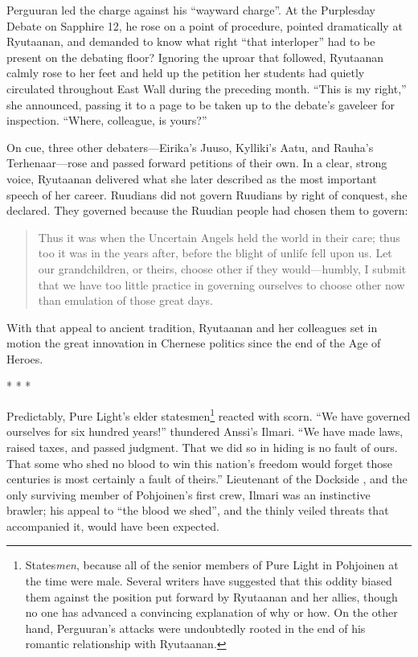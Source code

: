 \documentclass[12pt]{report}
\begin{document}
Perguuran led the charge against his ``wayward charge''.  At the
Purplesday Debate on Sapphire 12, he rose on a point of procedure,
pointed dramatically at Ryutaanan, and demanded to know what right
``that interloper'' had to be present on the debating floor?  Ignoring
the uproar that followed, Ryutaanan calmly rose to her feet and held
up the petition her students had quietly circulated throughout East
Wall during the preceding month.  ``This is my right,'' she announced,
passing it to a page to be taken up to the debate's gaveleer for
inspection.  ``Where, colleague, is yours?''

On cue, three other debaters---Eirika's Juuso, Kylliki's Aatu, and
Rauha's Terhenaar---rose and passed forward petitions of their own.
In a clear, strong voice, Ryutaanan delivered what she later described
as the most important speech of her career.  Ruudians did not govern
Ruudians by right of conquest, she declared.  They governed because
the Ruudian people had chosen them to govern:

\begin{quotation}
Thus it was when the Uncertain Angels held the world in their care;
thus too it was in the years after, before the blight of unlife fell
upon us.  Let our grandchildren, or theirs, choose other if they
would---humbly, I submit that we have too little practice in governing
ourselves to choose other now than emulation of those great days.
\end{quotation}

With that appeal to ancient tradition, Ryutaanan and her colleagues
set in motion the great innovation in Chernese politics since the end
of the Age of Heroes.

\begin{center}
* * *
\end{center}

Predictably, Pure Light's elder statesmen\footnote{States\emph{men},
because all of the senior members of Pure Light in Pohjoinen at the
time were male.  Several writers have suggested that this oddity
biased them against the position put forward by Ryutaanan and her
allies, though no one has advanced a convincing explanation of why or
how.  On the other hand, Perguuran's attacks were undoubtedly rooted
in the end of his romantic relationship with Ryutaanan.} reacted with
scorn.  ``We have governed ourselves for six hundred years!'' thundered
Anssi's Ilmari.  ``We have made laws, raised taxes, and passed
judgment.  That we did so in hiding is no fault of ours.  That some
who shed no blood to win this nation's freedom would forget those
centuries is most certainly a fault of theirs.''  Lieutenant of the
Dockside , and the only surviving member of Pohjoinen's
first  crew, Ilmari was an instinctive brawler; his
appeal to ``the blood we shed'', and the thinly veiled threats that
accompanied it, would have been expected.
\end{document}
